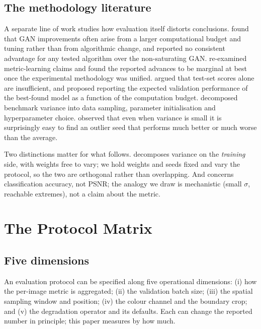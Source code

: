 \documentclass[10pt,twocolumn]{article}
\begin{document}


\subsection{The methodology literature}

A separate line of work studies how evaluation itself distorts conclusions.
\cite{lucic2018gans} found that GAN improvements often arise from a larger
computational budget and tuning rather than from algorithmic change, and
reported no consistent advantage for any tested algorithm over the
non-saturating GAN. \cite{musgrave2020reality} re-examined metric-learning
claims and found the reported advances to be marginal at best once the
experimental methodology was unified. \cite{dodge2019show} argued that
test-set scores alone are insufficient, and proposed reporting the expected
validation performance of the best-found model as a function of the
computation budget. \cite{bouthillier2021variance} decomposed benchmark
variance into data sampling, parameter initialisation and hyperparameter
choice. \cite{picard2021seed} observed that even when variance is small it
is surprisingly easy to find an outlier seed that performs much better or
much worse than the average.

Two distinctions matter for what follows. \cite{bouthillier2021variance}
decomposes variance on the \emph{training} side, with weights free to vary;
we hold weights and seeds fixed and vary the protocol, so the two are
orthogonal rather than overlapping. And \cite{picard2021seed} concerns
classification accuracy, not PSNR; the analogy we draw is mechanistic (small
$\sigma$, reachable extremes), not a claim about the metric.

\section{The Protocol Matrix}

\subsection{Five dimensions}

An evaluation protocol can be specified along five operational dimensions:
(i) how the per-image metric is aggregated; (ii) the validation batch size;
(iii) the spatial sampling window and position; (iv) the colour channel and
the boundary crop; and (v) the degradation operator and its defaults. Each
can change the reported number in principle; this paper measures by how much.
\end{document}

